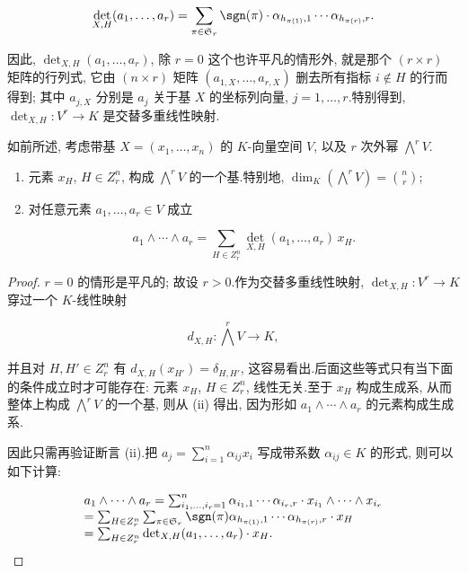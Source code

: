 \[
\det_{X, H}(a_1, \ldots, a_r) = \sum_{\pi \in \mathfrak{S}_r} \sgn(\pi) \cdot \alpha_{h_{\pi(1)}, 1} \cdots \alpha_{h_{\pi(r)}, r}.
\]

因此, $\det_{X, H}(a_1, \ldots, a_r)$, 除 $r = 0$ 这个也许平凡的情形外, 就是那个 $(r \times r)$ 矩阵的行列式, 它由 $(n \times r)$ 矩阵 $(a_{1, X}, \ldots, a_{r, X})$ 删去所有指标 $i \notin H$ 的行而得到; 其中 $a_{j, X}$ 分别是 $a_j$ 关于基 $X$ 的坐标列向量, $j = 1, \ldots, r$.特别得到, $\det_{X, H} \colon V^r \longrightarrow K$ 是交替多重线性映射.

\begin{theorem}\label{thm:4.5.4}
如前所述, 考虑带基 $X = (x_1, \ldots, x_n)$ 的 $K$-向量空间 $V$, 以及 $r$ 次外幂 $\bigwedge^r V$.
\begin{enumerate}
\item[(i)] 元素 $x_H$, $H \in Z_r^n$, 构成 $\bigwedge^r V$ 的一个基.特别地, $\dim_K \left(\bigwedge^r V\right) = \binom{n}{r}$;
\item[(ii)] 对任意元素 $a_1, \ldots, a_r \in V$ 成立

\[
a_1 \wedge \cdots \wedge a_r = \sum_{H \in Z_r^n} \det_{X, H}(a_1, \ldots, a_r) \, x_H.
\]
\end{enumerate}
\end{theorem}

\begin{proof}
$r = 0$ 的情形是平凡的; 故设 $r > 0$.作为交替多重线性映射, $\det_{X, H} \colon V^r \longrightarrow K$ 穿过一个 $K$-线性映射

\[
d_{X, H} \colon \bigwedge^r V \longrightarrow K,
\]

并且对 $H, H' \in Z_r^n$ 有 $d_{X, H}(x_{H'}) = \delta_{H, H'}$, 这容易看出.后面这些等式只有当下面的条件成立时才可能存在: 元素 $x_H$, $H \in Z_r^n$, 线性无关.至于 $x_H$ 构成生成系, 从而整体上构成 $\bigwedge^r V$ 的一个基, 则从 (ii) 得出, 因为形如 $a_1 \wedge \cdots \wedge a_r$ 的元素构成生成系.

因此只需再验证断言 (ii).把 $a_j = \sum_{i = 1}^{n} \alpha_{ij} x_i$ 写成带系数 $\alpha_{ij} \in K$ 的形式, 则可以如下计算:

\[
\begin{array}{l}
a_1 \wedge \cdots \wedge a_r = \sum_{i_1, \ldots, i_r = 1}^{n} \alpha_{i_1, 1} \cdots \alpha_{i_r, r} \cdot x_{i_1} \wedge \cdots \wedge x_{i_r} \\
= \sum_{H \in Z_r^n} \sum_{\pi \in \mathfrak{S}_r} \sgn(\pi) \alpha_{h_{\pi(1)}, 1} \cdots \alpha_{h_{\pi(r)}, r} \cdot x_H \\
= \sum_{H \in Z_r^n} \det_{X, H}(a_1, \ldots, a_r) \cdot x_H.
\end{array}
\]
\end{proof}

